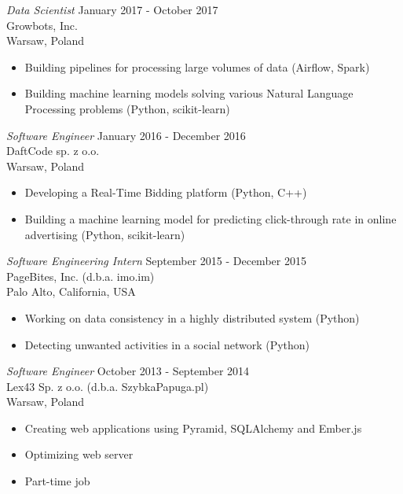 \documentclass[margin, 10pt]{res} %
\begin{document}
\begin{resume}
{\sl Data Scientist} \hfill January 2017 - October 2017 \\
Growbots, Inc. \\
Warsaw, Poland

\begin{itemize} \itemsep -2pt %
\item Building pipelines for processing large volumes of data (Airflow, Spark)
\item Building machine learning models solving various Natural Language Processing problems (Python, scikit-learn)
\end{itemize}

{\sl Software Engineer} \hfill January 2016 - December 2016 \\
DaftCode sp. z o.o. \\
Warsaw, Poland

\begin{itemize} \itemsep -2pt %
\item Developing a Real-Time Bidding platform (Python, C++)
\item Building a machine learning model for predicting click-through rate in online advertising (Python, scikit-learn)
\end{itemize}

{\sl Software Engineering Intern} \hfill September 2015 - December 2015 \\
PageBites, Inc. (d.b.a. imo.im) \\
Palo Alto, California, USA

\begin{itemize} \itemsep -2pt %
\item Working on data consistency in a highly distributed system (Python)
\item Detecting unwanted activities in a social network (Python)
\end{itemize}


{\sl Software Engineer} \hfill October 2013 - September 2014 \\
Lex43 Sp. z o.o. (d.b.a. SzybkaPapuga.pl) \\
Warsaw, Poland

\begin{itemize} \itemsep -2pt %
\item Creating web applications using Pyramid, SQLAlchemy and Ember.js
\item Optimizing web server
\item Part-time job
\end{itemize}
 

\end{resume}
\end{document}

